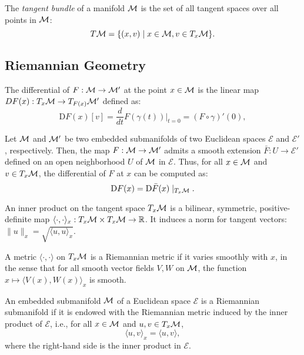 \begin{definition}
    The \textit{tangent bundle} of a manifold $\mathcal{M}$ is the set of all tangent spaces over all points in $\mathcal{M}$:
    \[
        T\mathcal{M} = \{ (x,v) \mid x \in \mathcal{M}, v \in T_x \mathcal{M} \}.
    \]
\end{definition}

\subsection{Riemannian Geometry}
\begin{definition}[Differential]
    The differential of $F: \mathcal{M} \to \mathcal{M}'$ at the point $x \in \mathcal{M}$ is the linear map $DF(x) : T_x \mathcal{M} \to T_{F(x)} \mathcal{M}'$ defined as:
    \[
        \textrm{D}F(x)[v] = \frac{d}{dt} F(\gamma(t)) \Big|_{t = 0} = (F \circ \gamma)'(0),
    \]
    
    Let $\mathcal{M}$ and $\mathcal{M}'$ be two embedded submanifolds of two Euclidean spaces $\mathcal{E}$ and $\mathcal{E}'$, respectively. Then, the map $F : \mathcal{M} \to \mathcal{M}'$ admits a smooth extension $\bar{F} : U \to \mathcal{E}'$ defined on an open neighborhood $U$ of $\mathcal{M}$ in $\mathcal{E}$. Thus, for all $x \in \mathcal{M}$ and $v \in T_x \mathcal{M}$, the differential of $F$ at $x$ can be computed as:
    \[
        \textrm{D}F(x) = \textrm{D}\bar{F}(x) \mid_{T_x \mathcal{M}}.
    \]
\end{definition}

\begin{definition}
    An inner product on the tangent space $T_x \mathcal{M}$ is a bilinear, symmetric, positive-definite map $\langle \cdot, \cdot \rangle_x : T_x \mathcal{M} \times T_x \mathcal{M} \to \mathbb{R}$. It induces a norm for tangent vectors: $\lVert u \rVert_x = \sqrt{\langle u, u \rangle_x}$.
\end{definition}

\begin{definition}
    A metric $\langle \cdot, \cdot \rangle$ on $T_x \mathcal{M}$ is a Riemannian metric if it varies smoothly with $x$, in the sense that for all smooth vector fields $V,W$ on $\mathcal{M}$, the function $x \mapsto \langle V(x), W(x) \rangle_x$ is smooth.
\end{definition}

\begin{definition}
    An embedded submanifold $\mathcal{M}$ of a Euclidean space $\mathcal{E}$ is a Riemannian submanifold if it is endowed with the Riemannian metric induced by the inner product of $\mathcal{E}$, i.e., for all $x \in \mathcal{M}$ and $u,v \in T_x \mathcal{M}$,
    \[
        \langle u, v \rangle_x = \langle u, v \rangle,
    \]
    where the right-hand side is the inner product in $\mathcal{E}$.
    
\end{definition}

